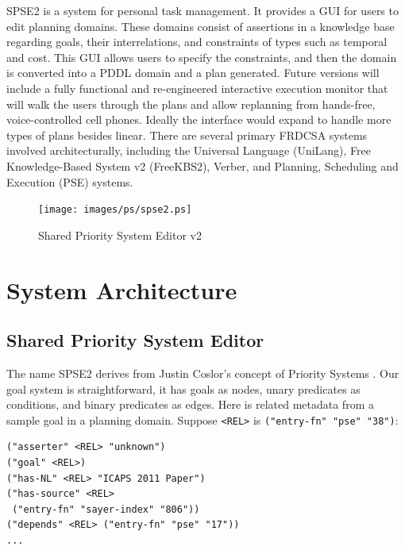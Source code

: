 \documentclass[letterpaper]{article}
\begin{document}
\noindent SPSE2 is a system for personal task management.  It provides
a GUI for users to edit planning domains.  These domains consist of
assertions in a knowledge base regarding goals, their interrelations,
and constraints of types such as temporal and cost.  This GUI allows
users to specify the constraints, and then the domain is converted
into a PDDL domain and a plan generated.  Future versions will include
a fully functional and re-engineered interactive execution monitor
that will walk the users through the plans and allow replanning from
hands-free, voice-controlled cell phones.  Ideally the interface would
expand to handle more types of plans besides linear.  There are
several primary FRDCSA systems involved architecturally, including the
Universal Language (UniLang), Free Knowledge-Based System v2
(FreeKBS2), Verber, and Planning, Scheduling and Execution (PSE)
systems.

\begin{figure}[h!]
  \centering
      \texttt{[image: images/ps/spse2.ps]}
  \caption{Shared Priority System Editor v2}
\end{figure}


\section{System Architecture}

\subsection{Shared Priority System Editor}

The name SPSE2 derives from Justin Coslor's concept of Priority
Systems \cite{coslor2008}.  Our goal system is straightforward, it has
goals as nodes, unary predicates as conditions, and binary predicates
as edges.  Here is related metadata from a sample goal in a planning
domain.  Suppose {\tt <REL>} is {\tt ("entry-fn" "pse" "38")}:

\begin{footnotesize}
\begin{verbatim}
("asserter" <REL> "unknown")
("goal" <REL>)
("has-NL" <REL> "ICAPS 2011 Paper")
("has-source" <REL>
 ("entry-fn" "sayer-index" "806"))
("depends" <REL> ("entry-fn" "pse" "17"))
...
\end{verbatim}
\end{footnotesize}
\end{document}

